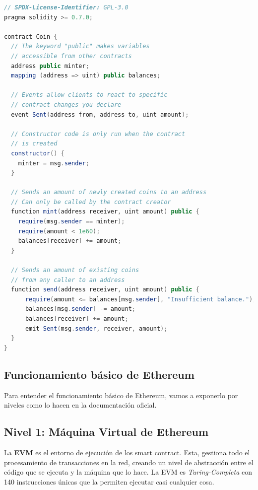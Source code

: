 \begin{lstlisting}[language=Java,float=ht,caption={[Solidity Contract]Ejemplo de código fuente de un smart contract escrito en Solidity},label=lst:java]
// SPDX-License-Identifier: GPL-3.0
pragma solidity >= 0.7.0;

contract Coin {
  // The keyword "public" makes variables
  // accessible from other contracts
  address public minter;
  mapping (address => uint) public balances;

  // Events allow clients to react to specific
  // contract changes you declare
  event Sent(address from, address to, uint amount);

  // Constructor code is only run when the contract
  // is created
  constructor() {
    minter = msg.sender;
  }

  // Sends an amount of newly created coins to an address
  // Can only be called by the contract creator
  function mint(address receiver, uint amount) public {
    require(msg.sender == minter);
    require(amount < 1e60);
    balances[receiver] += amount;
  }

  // Sends an amount of existing coins
  // from any caller to an address
  function send(address receiver, uint amount) public {
      require(amount <= balances[msg.sender], "Insufficient balance.");
      balances[msg.sender] -= amount;
      balances[receiver] += amount;
      emit Sent(msg.sender, receiver, amount);
  }
}
\end{lstlisting}

\subsection{Funcionamiento básico de Ethereum}

Para entender el funcionamiento básico de Ethereum, vamos a exponerlo por niveles como lo hacen en la documentación oficial\cite{etherStack}. 

\subsection{Nivel 1: Máquina Virtual de Ethereum} 

La \textbf{EVM} es el entorno de ejecución de los smart contract. Esta, gestiona todo el procesamiento de transacciones en la red, creando un nivel de abstracción entre el código que se ejecuta y la máquina que lo hace. La EVM es \emph{Turing-Completa} con 140 instrucciones únicas que la permiten ejecutar casi cualquier cosa. 

